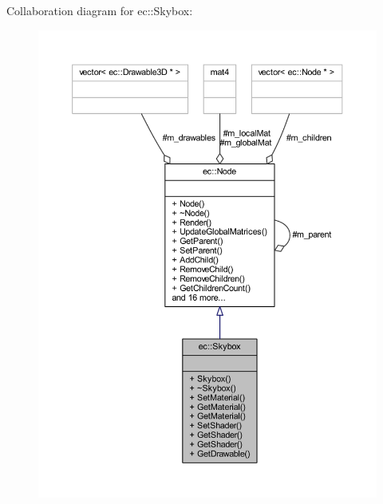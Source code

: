 Collaboration diagram for ec\+:\+:Skybox\+:
\nopagebreak
\begin{figure}[H]
\begin{center}
\leavevmode
\includegraphics[width=350pt]{classec_1_1_skybox__coll__graph}
\end{center}
\end{figure}
